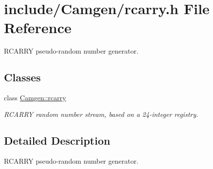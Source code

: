 \hypertarget{a00729}{\section{include/\-Camgen/rcarry.h File Reference}
\label{a00729}
}


R\-C\-A\-R\-R\-Y pseudo-\/random number generator.  


\subsection*{Classes}
\begin{DoxyCompactItemize}
\item 
class \hyperlink{a00461}{Camgen\-::rcarry}
\begin{DoxyCompactList}\small\item\em R\-C\-A\-R\-R\-Y random number stream, based on a 24-\/integer registry. \end{DoxyCompactList}\end{DoxyCompactItemize}


\subsection{Detailed Description}
R\-C\-A\-R\-R\-Y pseudo-\/random number generator. 
